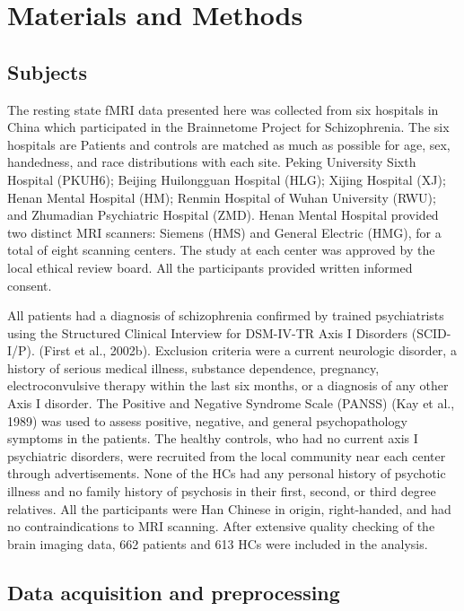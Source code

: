 \documentclass[preprint,authoryear,review,12pt]{elsarticle}
\begin{document}
\section*{Materials and Methods}

\subsection*{Subjects}

The resting state fMRI data presented here was collected from six hospitals in China which participated in the Brainnetome Project for Schizophrenia. The six hospitals are  Patients and controls are matched as much as possible for age, sex, handedness, and race distributions with each site. Peking University Sixth Hospital (PKUH6); Beijing Huilongguan Hospital (HLG); Xijing Hospital (XJ); Henan Mental Hospital (HM);  Renmin Hospital of Wuhan University (RWU); and Zhumadian Psychiatric Hospital (ZMD). Henan Mental Hospital provided two distinct MRI scanners: Siemens (HMS) and General Electric (HMG), for a total of eight scanning centers. The study at each center was approved by the local ethical review board. All the participants provided written informed consent.

All patients had a diagnosis of schizophrenia confirmed by trained psychiatrists using the Structured Clinical Interview for DSM-IV-TR Axis I Disorders (SCID-I/P). (First et al., 2002b). Exclusion criteria were a current neurologic disorder, a history of serious medical illness, substance dependence, pregnancy, electroconvulsive therapy within the last six months, or a diagnosis of any other Axis I disorder. The Positive and Negative Syndrome Scale (PANSS)  (Kay et al., 1989) was used to assess positive, negative, and general psychopathology symptoms in the patients. The healthy controls, who had no current axis I psychiatric disorders, were recruited from the local community near each center through advertisements. None of the HCs had any personal history of psychotic illness and no family history of psychosis in their first, second, or third degree relatives. All the participants were Han Chinese in origin, right-handed, and had no contraindications to MRI scanning. After extensive quality checking of the brain imaging data, 662 patients and 613 HCs were included in the analysis.
 
 
 
\subsection*{Data acquisition and preprocessing}
 
\end{document}
